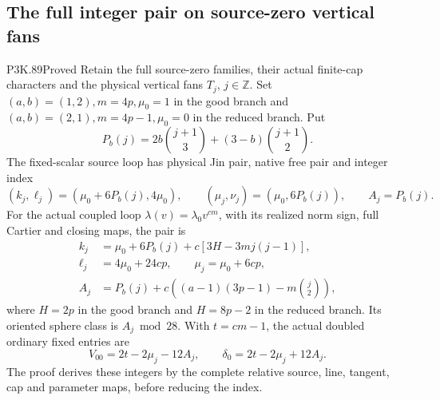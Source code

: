 \subsection{The full integer pair on source-zero vertical fans}
\begin{statement}{P3K.89}{Proved}
Retain the full source-zero families, their actual finite-cap
characters and the physical vertical fans \(T_j\), \(j\in\mathbb Z\).
Set \((a,b)=(1,2),m=4p,\mu_0=1\) in the good branch and
\((a,b)=(2,1),m=4p-1,\mu_0=0\) in the reduced branch. Put
\[
 P_b(j)=2b\binom{j+1}{3}+(3-b)\binom{j+1}{2}.
\]
The fixed-scalar source loop has physical Jin pair, native free
pair and integer index
\[
 (k_j,\ell_j)=(\mu_0+6P_b(j),4\mu_0),\qquad
 (\mu_j,\nu_j)=(\mu_0,6P_b(j)),\qquad A_j=P_b(j).
\]
For the actual coupled loop \(\lambda(v)=\lambda_0v^{cm}\), with
its realized norm sign, full Cartier and closing maps, the pair is
\[
\begin{aligned}
 k_j&=\mu_0+6P_b(j)+c[3H-3m j(j-1)],\\
 \ell_j&=4\mu_0+24cp,\qquad \mu_j=\mu_0+6cp,\\
 A_j&=P_b(j)+c\left((a-1)(3p-1)-m\binom j2\right),
\end{aligned}
\]
where \(H=2p\) in the good branch and \(H=8p-2\) in the reduced
branch. Its oriented sphere class is \(A_j\bmod28\).
With \(t=cm-1\), the actual doubled ordinary fixed entries are
\[
 V_{00}=2t-2\mu_j-12A_j,\qquad
 \delta_0=2t-2\mu_j+12A_j.
\]
The proof derives these integers by the complete relative source,
line, tangent, cap and parameter maps, before reducing the index.
\end{statement}
